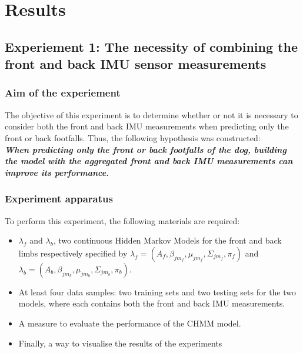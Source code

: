 \chapter{Results}

\section{Experiement 1: The necessity of combining the front and back IMU sensor measurements}

\subsection{Aim of the experiement}
The objective of this experiment is to determine whether or not it is necessary to consider both the front and back IMU measurements when predicting only the front or back footfalls. Thus, the following hypothesis was constructed:\\
\textbf{\textit{When predicting only the front or back footfalls of the dog, building the model with the aggregated front and back IMU measurements can improve its performance.}}

\subsection{Experiment apparatus}
To perform this experiment, the following materials are required:
\begin{itemize}
	\item \(\lambda_f\) and \(\lambda_b\), two continuous Hidden Markov Models for the front and back limbs respectively specified by \(\lambda_f = (A_f, \beta_{jm_f}, \mu_{jm_f}, \Sigma_{jm_f}, \pi_f)\) and \(\lambda_b = (A_b, \beta_{jm_b}, \mu_{jm_b}, \Sigma_{jm_b}, \pi_b)\).
	\item At least four data samples: two training sets and two testing sets for the two models, where each contains both the front and back IMU measurements.
	\item A measure to evaluate the performance of the CHMM model.
	\item Finally, a way to visualise the results of the experiments
\end{itemize}

